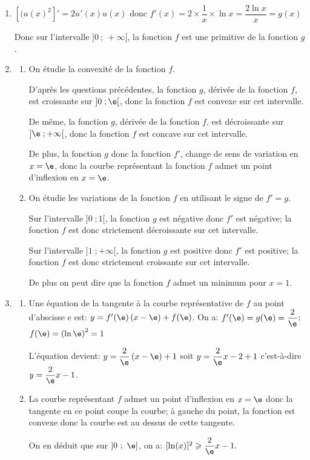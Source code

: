 \begin{enumerate}
\item %
$[(u(x)^2]' = 2u'(x)u(x)$ donc
$f'(x)= 2\times \dfrac{1}{x}\times \ln x = \dfrac{2\ln x}{x}=g(x)$

Donc sur l'intervalle $]0~;~+ \infty[$, la fonction $f$ est une primitive de la fonction $g$.

\item %
	\begin{enumerate}
		\item On étudie la convexité de la fonction $f$.
		
D'après les questions précédentes, la fonction $g$, dérivée de la fonction $f$, est croissante sur $]0\;; \e[$, donc la fonction $f$ est convexe sur cet intervalle.		
		
De même, la fonction $g$, dérivée de la fonction $f$, est décroissante sur $]\e\;; +\infty[$, donc la fonction $f$ est concave sur cet intervalle.

De plus, la fonction $g$ donc la fonction $f'$, change de sens de variation en $x=\e$, donc la courbe représentant la fonction $f$ admet un point d'inflexion en $x=\e$.
		
		\item On étudie les variations de la fonction $f$ en utilisant le signe de $f'=g$.
		
Sur l'intervalle $]0\;; 1[$, la fonction $g$ est négative donc $f'$ est négative; la fonction $f$ est donc strictement décroissante sur cet intervalle.

Sur l'intervalle $]1\;; +\infty[$, la fonction $g$ est positive donc $f'$ est positive; la fonction $f$ est donc strictement croissante sur cet intervalle.

De plus on peut dire que la fonction $f$ admet un minimum pour $x=1$.
		
\end{enumerate}
\item 
	\begin{enumerate}
		\item Une équation de la tangente à la courbe représentative de $f$ au point d'abscisse e est: $y=f'(\e)\left (x-\e\right )+f(\e)$. On a: $f'(\e) = g(\e)=\dfrac{2}{\e}$; $f(\e)=\left (\ln\e\right )^2=1$

L'équation devient: $y=\dfrac{2}{\e}\left (x-\e\right ) +1$ soit
$y=\dfrac{2}{\e}x -2+1$ c'est-à-dire $y=\dfrac{2}{\e}x-1$.
		
		\item %
La courbe représentant $f$ admet un point d'inflexion en $x=\e$ donc la tangente en ce point coupe la courbe; à gauche du point, la fonction est convexe donc la courbe est au dessus de cette tangente.

On en déduit que sur  $]0~;~\e]$, on a: $[\ln (x)]^2 \geqslant \dfrac{2}{\e}x - 1.$

	\end{enumerate}
\end{enumerate}

\bigskip

